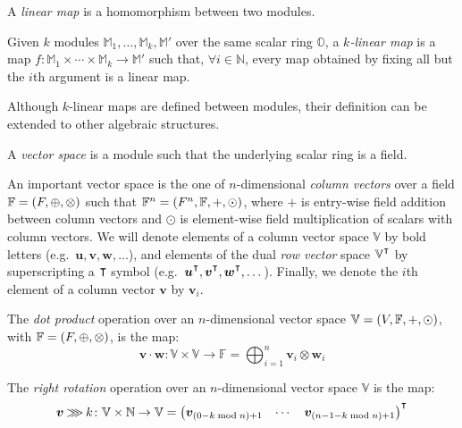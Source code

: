 \begin{definition}
  A \emph{linear map} is a homomorphism between two modules.
\end{definition}
\begin{definition}
 Given \(k\) modules \(\mathbb{M}_1, \dots, \mathbb{M}_k, \mathbb{M}'\) over the same scalar 
 ring \(\mathbb{O}\), a \emph{\(k\)-linear map} is a map
 \(f\colon \mathbb{M}_1 \times \cdots \times \mathbb{M}_k \to \mathbb{M}'\) 
 such that, \(\forall i \in \mathbb{N}\), every map obtained by fixing all but the 
 \(i\)th argument is a linear map.
\end{definition}

Although \(k\)-linear maps are defined between modules, their definition can be extended to other
algebraic structures.

\begin{definition}
  A \emph{vector space} is a module such that the underlying scalar ring is a field.
\end{definition} 

An important vector space is the one of \(n\)-dimensional \emph{column vectors} over a 
field \(\mathbb{F} = \left(F, \oplus, \otimes\right)\) such that \(\mathbb{F}^n = 
\left(F^n, \mathbb{F}, +, \odot\right)\), where \(+\) is entry-wise field addition between 
column vectors and \(\odot \) is element-wise field multiplication of scalars with column vectors.
We will denote elements of a column vector space \(\mathbb{V}\) by bold letters 
(e.g.\  \(\bm{u}, \bm{v}, \bm{w}, \dots \)), and elements of the dual \emph{row vector} space 
\(\mathbb{V}^{\transpose}\) by superscripting a \(\transpose \) symbol
(e.g.\  \(\bm{u}^{\transpose}, \bm{v}^{\transpose}, \bm{w}^{\transpose}, \dots \)). 
Finally, we denote the \(i\)th element of a column vector \(\bm{v}\) by \(\bm{v}_i\).
\begin{definition}
  The \emph{dot product} operation over an \(n\)-dimensional vector space 
  \(\mathbb{V} = \left(V, \mathbb{F}, +, \odot\right)\), with \(\mathbb{F} = \left(F, \oplus, \otimes\right)\),
  is the map:
  \[
    \bm{v} \cdot \bm{w}\colon \mathbb{V} \times \mathbb{V} \to \mathbb{F} = 
    \bigoplus_{i = 1}^{n}{\bm{v}_i \otimes \bm{w}_i}
  \]
\end{definition}
\begin{definition}
  The \emph{right rotation} operation over an \(n\)-dimensional vector space \(\mathbb{V}\) is 
  the map:
  \[
    \bm{v} \Rrot k\colon \mathbb{V} \times \mathbb{N} \to \mathbb{V} = 
    \begin{pmatrix}
      \bm{v}_{\Parens*{0 - k \bmod n} + 1} & \cdots & \bm{v}_{\Parens*{n - 1 - k \bmod n} + 1}
    \end{pmatrix}^{\transpose}
  \]
\end{definition}

